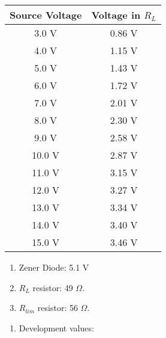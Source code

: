 \begin{tasks}
\begin{multicols}{2}
\begin{enumerate}
\begin{center}
\begin{tabular}[.5cm]{ c c }
\toprule
Source Voltage & Voltage in $R_{L}$ \\
\midrule
3.0 V & 0.86 V \\
\cmidrule{1-2}
4.0 V & 1.15 V \\
\cmidrule{1-2}
5.0 V & 1.43 V \\
\cmidrule{1-2}
6.0 V & 1.72 V \\
\cmidrule{1-2}
7.0 V & 2.01 V \\
\cmidrule{1-2}
8.0 V & 2.30 V \\
\cmidrule{1-2}
9.0 V & 2.58 V \\
\cmidrule{1-2}
10.0 V & 2.87 V \\
\cmidrule{1-2}
11.0 V & 3.15 V \\
\cmidrule{1-2}
12.0 V & 3.27 V \\
\cmidrule{1-2}
13.0 V & 3.34 V \\
\cmidrule{1-2}
14.0 V & 3.40 V \\
\cmidrule{1-2}
15.0 V & 3.46 V \\
\bottomrule
\end{tabular}
\end{center} 
\end{enumerate}
\end{multicols}

\begin{enumerate}
\item Zener Diode: 5.1 V
\item $R_{L}$ resistor: 49 $\Omega$.
\item $R_{lim}$ resistor: 56 $\Omega$.
\end{enumerate}

\begin{multicols}{2}
\begin{enumerate}
\item Development values:


\end{enumerate}
\end{multicols}
\end{tasks}
